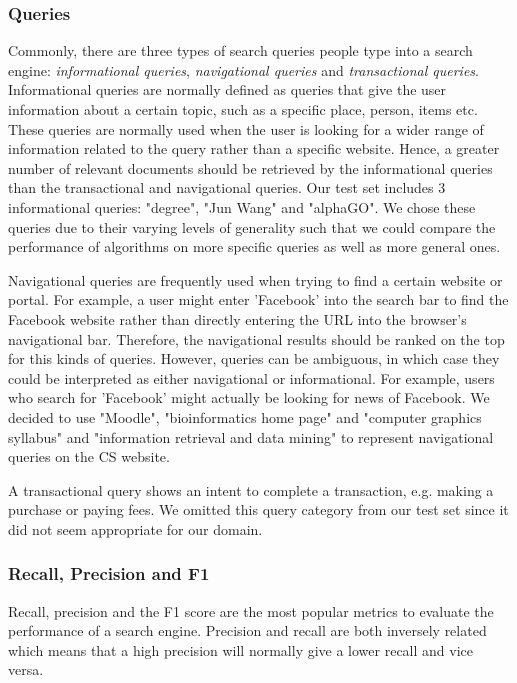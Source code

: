 \subsubsection{Queries}
\label{ssub:evaluation_queries}
Commonly, there are three types of search queries people type into a search engine: \emph{informational queries}, \emph{navigational queries} and \emph{transactional queries}.
Informational queries are normally defined as queries that give the user information about a certain topic, such as a specific place, person, items etc. These queries are normally used when the user is looking for a wider range of information related to the query rather than a specific website. Hence, a greater number of relevant documents should be retrieved by the informational queries than the transactional and navigational queries. Our test set includes 3 informational queries: "degree", "Jun Wang" and "alphaGO". We chose these queries due to their varying levels of generality such that we could compare the performance of algorithms on more specific queries as well as more general ones.

Navigational queries are frequently used when trying to find a certain website or portal. For example, a user might enter 'Facebook' into the search bar to find the Facebook website rather than directly entering the URL into the browser's navigational bar. Therefore, the navigational results should be ranked on the top for this kinds of queries. However, queries can be ambiguous, in which case they could be interpreted as either navigational or informational. For example, users who search for 'Facebook' might actually be looking for news of Facebook. We decided to use "Moodle", "bioinformatics home page" and "computer graphics syllabus" and "information retrieval and data mining" to represent navigational queries on the CS website.

A transactional query shows an intent to complete a transaction, e.g. making a purchase or paying fees. We omitted this query category from our test set since it did not seem appropriate for our domain.

\subsubsection{Recall, Precision and F1}
Recall, precision and the F1 score are the most popular metrics to evaluate the performance of a search engine. Precision and recall are both inversely related which means that a high precision will normally give a lower recall and vice versa.

